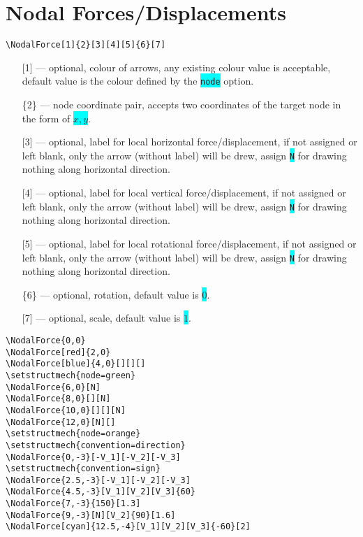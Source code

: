 \documentclass[10pt,a4paper]{article}
\newcommand*{\Highlight}[1]{\colorbox{cyan}{\color{red}\texttt{#1}}}
\begin{document}
\section{Nodal Forces/Displacements}
\begin{Verbatim}[frame=single,label=Syntax]
\NodalForce[1]{2}[3][4][5]{6}[7]
\end{Verbatim}
\begin{itemize}
\item[][1] --- optional, colour of arrows, any existing colour value is acceptable, default value is the colour defined by the \Highlight{node} option.
\item[]\{2\} --- node coordinate pair, accepts two coordinates of the target node in the form of \Highlight{$x,y$}.
\item[][3] --- optional, label for local horizontal force/displacement, if not assigned or left blank, only the arrow (without label) will be drew, assign \Highlight{N} for drawing nothing along horizontal direction.
\item[][4] --- optional, label for local vertical force/displacement, if not assigned or left blank, only the arrow (without label) will be drew, assign \Highlight{N} for drawing nothing along horizontal direction.
\item[][5] --- optional, label for local rotational force/displacement, if not assigned or left blank, only the arrow (without label) will be drew, assign \Highlight{N} for drawing nothing along horizontal direction.
\item[]\{6\} --- optional, rotation, default value is \Highlight{$0$}.
\item[][7] --- optional, scale, default value is \Highlight{$1$}.
\end{itemize}
\begin{Verbatim}[frame=single,label=Example]
\NodalForce{0,0}
\NodalForce[red]{2,0}
\NodalForce[blue]{4,0}[][][]
\setstructmech{node=green}
\NodalForce{6,0}[N]
\NodalForce{8,0}[][N]
\NodalForce{10,0}[][][N]
\NodalForce{12,0}[N][]
\setstructmech{node=orange}
\setstructmech{convention=direction}
\NodalForce{0,-3}[-V_1][-V_2][-V_3]
\setstructmech{convention=sign}
\NodalForce{2.5,-3}[-V_1][-V_2][-V_3]
\NodalForce{4.5,-3}[V_1][V_2][V_3]{60}
\NodalForce{7,-3}{150}[1.3]
\NodalForce{9,-3}[N][V_2]{90}[1.6]
\NodalForce[cyan]{12.5,-4}[V_1][V_2][V_3]{-60}[2]
\end{Verbatim}
\begin{figure}[H]
\centering
{}
\end{figure}
\end{document}
